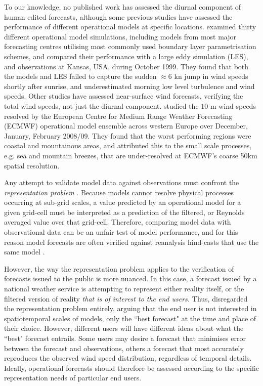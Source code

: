 \documentclass{ametsoc}
\begin{document}
To our knowledge, no published work has assessed the diurnal component of human edited forecasts, although some previous studies have assessed the performance of different operational models at specific locations. \citet{svensson11} examined thirty different operational model simulations, including models from most major forecasting centres utilising most commonly used boundary layer parametrisation schemes, and compared their performance with a large eddy simulation (LES), and observations at Kansas, USA, during October 1999. They found that both the models and LES failed to capture the sudden $\approx 6$ kn jump in wind speeds shortly after sunrise, and underestimated morning low level turbulence and wind speeds. Other studies have assessed near-surface wind forecasts, verifying the total wind speeds, not just the diurnal component. \citet{pinson12} studied the 10 m wind speeds resolved by the European Centre for Medium Range Weather Forecasting (ECMWF) operational model ensemble across western Europe over December, January, February 2008/09. They found that the worst performing regions were coastal and mountainous areas, and attributed this to the small scale processes, e.g. sea and mountain breezes, that are under-resolved at ECMWF's coarse 50km spatial resolution. 

Any attempt to validate model data against observations must confront the \textit{representation problem} \citep[e.g.][]{zaron06}. Because models cannot resolve physical processes occurring at sub-grid scales, a value predicted by an operational model for a given grid-cell must be interpreted as a prediction of the filtered, or Reynolds averaged value over that grid-cell. Therefore, comparing model data with observational data can be an unfair test of model performance, and for this reason model forecasts are often verified against reanalysis hind-casts that use the same model \citep[e.g.][]{lynch14}.

However, the way the representation problem applies to the verification of forecasts issued to the public is more nuanced. In this case, a forecast issued by a national weather service is attempting to represent either reality itself, or the filtered version of reality \textit{that is of interest to the end users.} Thus, \citet{pinson12} disregarded the representation problem entirely, arguing that the end user is not interested in spatiotemporal scales of models, only the ``best forecast" at the time and place of their choice. However, different users will have different ideas about what the ``best" forecast entrails. Some users may desire a forecast that minimises error between the forecast and observations, others a forecast that most accurately reproduces the observed wind speed distribution, regardless of temporal details. Ideally, operational forecasts should therefore be assessed according to the specific representation needs of particular end users. 
\end{document}
